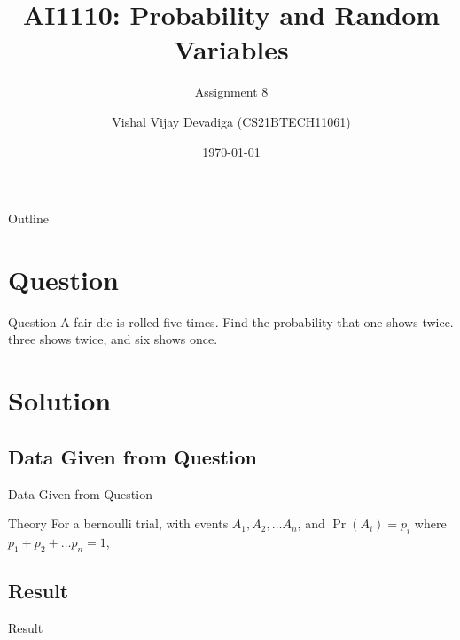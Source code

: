 \documentclass{beamer}
\title{AI1110: Probability and Random Variables}
\subtitle{Assignment 8}
\author{Vishal Vijay Devadiga (CS21BTECH11061)}
\date{\today}
\providecommand{\pr}[1]{\ensuremath{\Pr\left(#1\right)}}
\begin{document}
\begin{frame}
    \titlepage
\end{frame}

\logo{}

\begin{frame}{Outline}
    \tableofcontents
\end{frame}

\section{Question}
\begin{frame}{Question}
    A fair die is rolled five times. Find the probability that one shows twice. three shows twice, and six shows once.
\end{frame}

\section{Solution}
\subsection{Data Given from Question}
\begin{frame}{Data Given from Question}
    \begin{block}{Theory}
        For a bernoulli trial, with events $A_1,A_2, \dots A_n$, and $\pr{A_i} = p_i$ where
        $p_1 + p_2 + \dots p_n = 1$,
        
    \end{block}
\end{frame}

\subsection{Result}
\begin{frame}{Result}
    
\end{frame}
\end{document}
